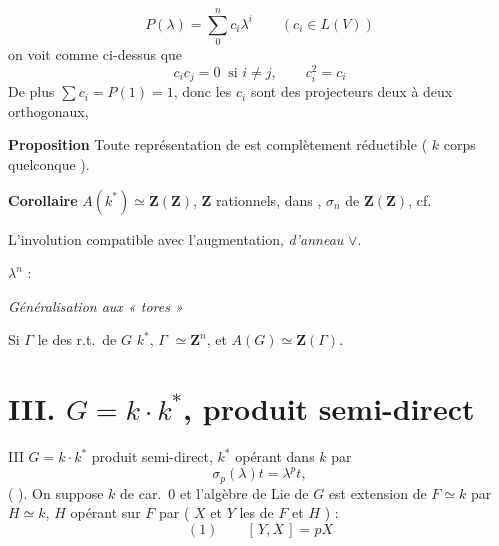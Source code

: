 \documentclass[11pt,a4paper]{article}
\begin{document}

\[ P(\lambda) = \sum_{0}^{n} c_{i} \lambda^{i} \qquad ( c_{i} \in L(V) ) \]
on voit comme ci-dessus que
\[ c_{i} c_{j} = 0 \ \text{ si } i \neq j , \qquad c_{i}^{2} = c_{i} \]
De plus $\sum c_{i} = P(1) = 1$, donc les $c_{i}$ sont des projecteurs deux à
deux orthogonaux, \ill{}

\textbf{Proposition} Toute représentation  de
 est complètement réductible ( $k$ corps \ill{}
quelconque ).

\textbf{Corollaire} $A(k^{*}) \simeq \mathbf{Z}(\mathbf{Z})$, $\mathbf{Z}$
\ill{} \ill{} \ill{} rationnels, dans \ill{} \ill{}, $\sigma_{n}$ \ill{} \ill{}
de $\mathbf{Z}(\mathbf{Z})$, \ill{} \ill{} \ill{} cf.

L'involution \ill{} \ill{} compatible avec l'augmentation, \ill{}
\emph{d'anneau} \ill{} $\vee$.

 \ill{} \ill{} \ill{} $\lambda^{n}$ : \ill{}

\emph{Généralisation aux « tores »  \ill{}}

Si $\Gamma$ \ill{} le  des \ill{} r.t.\ de $G$ \ill{} $k^{*}$,
$\Gamma$ \ill{} $\simeq \mathbf{Z}^{n}$, et $A(G) \simeq \mathbf{Z}(\Gamma)$.

\section*{III. \quad $G = k \cdot k^{*}$, produit semi-direct}


III \qquad $G = k \cdot k^{*}$ produit semi-direct, $k^{*}$ opérant dans $k$
par
\[ \sigma_{p}(\lambda) t = \lambda^{p} t , \]
(  \ill{} \emph{\ill{}} ). On suppose $k$ de
car.\ $0$ et l'algèbre de Lie \ill{}  de $G$ est extension de $F \simeq k$ par
$H \simeq k$, $H$ opérant sur $F$ par \ill{} ( $X$ et $Y$  les  
 de $F$ et $H$ ) :
\begin{equation*}
(1) \qquad [\,Y, X\,] = p X
\end{equation*}
\end{document}
